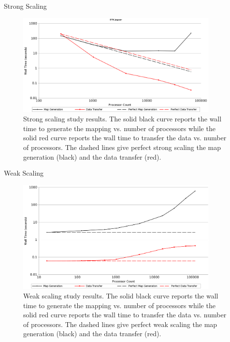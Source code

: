 \documentclass{beamer}
\begin{document}
\begin{frame}{Strong Scaling}

  \begin{figure}[htpb!]
    \centering
    \includegraphics[width=4in]{StrongScaling.png}
    \caption{Strong scaling study results. The solid black curve reports
      the wall time to generate the mapping vs. number of processors
      while the solid red curve reports the wall time to transfer the
      data vs. number of processors. The dashed lines give
      perfect strong scaling the map generation (black) and the data
      transfer (red).}
    \label{fig:strong_scaling}
  \end{figure}

\end{frame}

\begin{frame}{Weak Scaling}

  \begin{figure}[ht!]
    \centering
    \includegraphics[width=4in]{WeakScaling.png}
    \caption{Weak scaling study results. The solid black curve reports
      the wall time to generate the mapping vs. number of processors
      while the solid red curve reports the wall time to transfer the
      data vs. number of processors. The dashed lines give
      perfect weak scaling the map generation (black) and the data
      transfer (red).}
    \label{fig:weak_scaling}
  \end{figure}

\end{frame}
\end{document}
